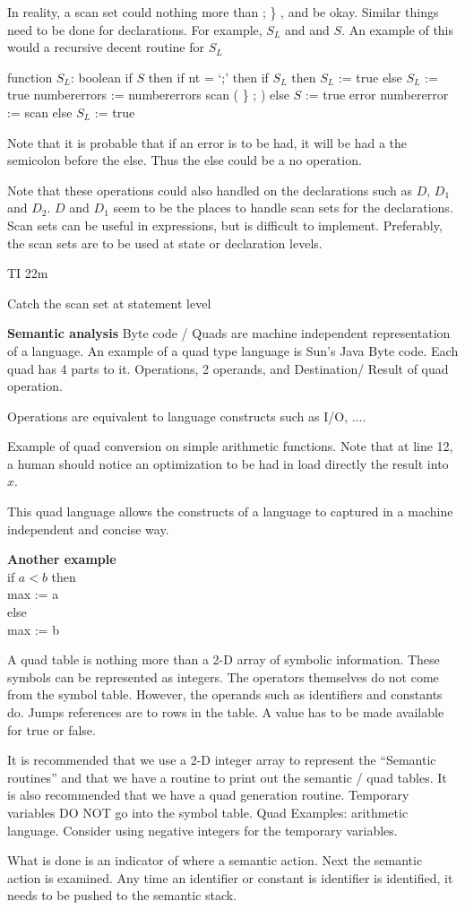  In reality, a scan set could nothing more than ; \} , and be okay.  Similar things need to be done for declarations.  For example, $S_L$ and and $S$.  An example of this would a recursive decent routine for $S_L$

 
 function $S_L$: boolean
 	if $S$ then 
		if nt = `;' then 
			if $S_L$ then $S_L$ := true
			else
				$S_L$ := true
				numbererrors := numbererrors 
				scan ( \} ; )
		else
			$S$ := true 
			error 
			numbererror := 
			scan
	else
		$S_L$ := true
		
Note that it is probable that if an error is to be had, it will be had a the semicolon before the else. Thus the else could be a no operation.	

Note that these operations could also handled on the declarations such as $D$, $D_1$ and $D_2$.  $D$ and $D_1$ seem to be the places to handle scan sets for the declarations.  Scan sets can be useful in expressions, but is difficult to implement.    Preferably, the scan sets are to be used at state or declaration levels.  

TI 22m



Catch the scan set at statement level

\textbf {Semantic analysis}
Byte code / Quads are machine independent representation of a language.   An example of a quad type language is Sun's Java Byte code.  Each quad has 4 parts to it.  Operations, 2 operands, and Destination/ Result of quad operation.  

Operations are equivalent to language constructs such as I/O, ....

Example of quad conversion on simple arithmetic functions.  
Note that at line 12, a human should notice an optimization to be had in load directly the result into $x$.

This quad language allows the constructs of a language to captured in a machine independent and concise way.

\textbf{Another example} \\
if $a < b$ then \\
max := a \\
else \\
max := b


A quad table is nothing more than a 2-D array of symbolic information.    These symbols can be represented as integers.  The operators themselves do not come from the symbol table.  However, the operands such as identifiers and constants do.  Jumps references are to rows in the table.   A value has to be made available for true or false.  

It is recommended that we use a 2-D integer array to represent the ``Semantic routines'' and that we have a routine to print out the semantic / quad tables.   It is also recommended that we have a quad  generation routine.  Temporary variables DO NOT go into the symbol table.  Quad Examples:  arithmetic language.  Consider using negative integers for the temporary variables.
				
			
What is done is an indicator of where a semantic action.   Next the semantic action is examined.  Any time an identifier or constant is identifier is identified, it needs to be pushed to the semantic stack.  
			